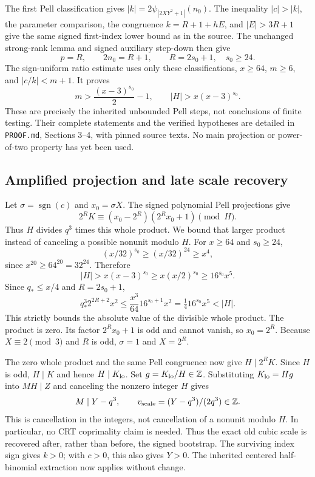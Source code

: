 The first Pell classification gives
$|k|=2\psi_{|2XY^2+1|}(n_0)$.
The inequality $|c|>|k|$, the parameter comparison, the congruence
$k=R+1+hE$, and $|E|>3R+1$ give the same signed first-index lower
bound as in the source. The unchanged strong-rank lemma and signed
auxiliary step-down then give
\[
 p=R,\qquad 2n_0=R+1,\qquad R=2s_0+1,\quad s_0\ge24.
\]
The sign-uniform ratio estimate uses only these classifications,
$x\ge64$, $m\ge6$, and $|c/k|<m+1$. It proves
\[
 m>\frac{(x-3)^{s_0}}2-1,\qquad |H|>x(x-3)^{s_0}.
\]
These are precisely the inherited unbounded Pell steps, not conclusions
of finite testing. Their complete statements and the verified hypotheses
are detailed in \texttt{PROOF.md}, Sections 3--4, with pinned source texts.
No main projection or power-of-two property has yet been used.

\subsection{Amplified projection and late scale recovery}
Let $\sigma=\operatorname{sgn}(c)$ and $x_0=\sigma X$.
The signed polynomial Pell projections give
\[
 2^R K\equiv(x_0-2^R)(2^Rx_0+1)\pmod H.
\]
Thus $H$ divides $q^3$ times this whole product. We bound that
larger product instead of canceling a possible nonunit modulo $H$.
For $x\ge64$ and $s_0\ge24$,
\[
 (x/32)^{s_0}\ge(x/32)^{24}\ge x^4,
\]
since $x^{20}\ge64^{20}=32^{24}$. Therefore
\[
 |H|>x(x-3)^{s_0}\ge x(x/2)^{s_0}\ge16^{s_0}x^5.
\]
Since $q_*\le x/4$ and $R=2s_0+1$,
\[
 q_*^3 2^{2R+2}x^2
 \le\frac{x^3}{64}16^{s_0+1}x^2
 =\tfrac14 16^{s_0}x^5<|H|.
\]
This strictly bounds the absolute value of the divisible whole product.
The product is zero. Its factor $2^Rx_0+1$ is odd and cannot vanish,
so $x_0=2^R$. Because $X\equiv2\pmod3$ and $R$ is odd,
$\sigma=1$ and $X=2^R$.

The zero whole product and the same Pell congruence now give
$H\mid2^RK$. Since $H$ is odd, $H\mid K$ and hence $H\mid K_{\rm lo}$.
Set $g=K_{\rm lo}/H\in\mathbb Z$. Substituting $K_{\rm lo}=Hg$ into
$MH\mid Z$ and canceling the nonzero integer $H$ gives
\[
 M\mid Y-q^3,\qquad v_{\rm scale}=(Y-q^3)/(2q^3)\in\mathbb Z.
\]
This is cancellation in the integers, not cancellation of a nonunit
modulo $H$. In particular, no CRT coprimality claim is needed.
Thus the exact old cubic scale is recovered after, rather than before,
the signed bootstrap. The surviving index sign gives $k>0$; with
$c>0$, this also gives $Y>0$. The inherited centered half-binomial
extraction now applies without change.

